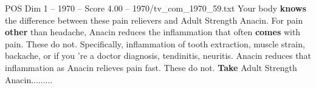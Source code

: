 \begin{textsample}{POS Dim 1 – 1970 – Score 4.00 – 1970/tv\_com\_1970\_59.txt}  \label{ex:f1_pos_035}
Your body \textbf{knows} the difference between these pain relievers and Adult Strength Anacin.
For pain \textbf{other} than headache, Anacin reduces the inflammation that often \textbf{comes} with pain.
These do not.
Specifically, inflammation of tooth extraction, muscle strain, backache, or if you 're a doctor diagnosis, tendinitis, neuritis.
Anacin reduces that inflammation as Anacin relieves pain fast.
These do not. \textbf{Take} Adult Strength Anacin.........

\end{textsample}
